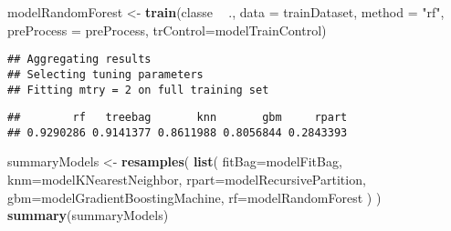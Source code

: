 \documentclass[]{article}
\newenvironment{Shaded}{\begin{snugshade}}{\end{snugshade}}
\newcommand{\KeywordTok}[1]{\textcolor[rgb]{0.13,0.29,0.53}{\textbf{#1}}}
\newcommand{\DataTypeTok}[1]{\textcolor[rgb]{0.13,0.29,0.53}{#1}}
\newcommand{\StringTok}[1]{\textcolor[rgb]{0.31,0.60,0.02}{#1}}
\newcommand{\OtherTok}[1]{\textcolor[rgb]{0.56,0.35,0.01}{#1}}
\newcommand{\ControlFlowTok}[1]{\textcolor[rgb]{0.13,0.29,0.53}{\textbf{#1}}}
\newcommand{\OperatorTok}[1]{\textcolor[rgb]{0.81,0.36,0.00}{\textbf{#1}}}
\newcommand{\NormalTok}[1]{#1}
\begin{document}
\begin{Shaded}
\begin{Highlighting}[]
\NormalTok{modelRandomForest            <-}\StringTok{ }\KeywordTok{train}\NormalTok{(classe }\OperatorTok{~}\StringTok{ }\NormalTok{., }\DataTypeTok{data =}\NormalTok{ trainDataset, }\DataTypeTok{method =} \StringTok{"rf"}\NormalTok{,      }\DataTypeTok{preProcess =}\NormalTok{ preProcess, }\DataTypeTok{trControl=}\NormalTok{modelTrainControl)}
\end{Highlighting}
\end{Shaded}

\begin{verbatim}
## Aggregating results
## Selecting tuning parameters
## Fitting mtry = 2 on full training set
\end{verbatim}

\begin{Shaded}
\end{Shaded}

\begin{verbatim}
##        rf   treebag       knn       gbm     rpart 
## 0.9290286 0.9141377 0.8611988 0.8056844 0.2843393
\end{verbatim}

\begin{Shaded}
\begin{Highlighting}[]
\NormalTok{summaryModels <-}\StringTok{ }\KeywordTok{resamples}\NormalTok{(}
  \KeywordTok{list}\NormalTok{(}
    \DataTypeTok{fitBag=}\NormalTok{modelFitBag,}
    \DataTypeTok{knm=}\NormalTok{modelKNearestNeighbor, }
    \DataTypeTok{rpart=}\NormalTok{modelRecursivePartition, }
    \DataTypeTok{gbm=}\NormalTok{modelGradientBoostingMachine,}
    \DataTypeTok{rf=}\NormalTok{modelRandomForest}
\NormalTok{  )}
\NormalTok{)}
\KeywordTok{summary}\NormalTok{(summaryModels)}
\end{Highlighting}
\end{Shaded}
\end{document}
